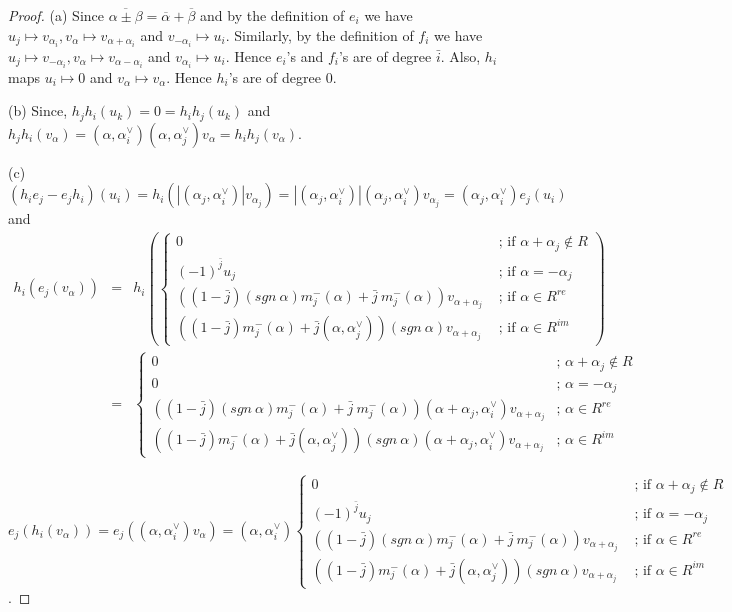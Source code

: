 \documentclass[11pt]{amsart}
\theoremstyle{plain}
\theoremstyle{definition}
\numberwithin{equation}{section}
\newcommand{\al}{\alpha}
\begin{document}
	\begin{proof} (a) Since $\overline{\alpha\pm\beta}=\overline\alpha+\overline\beta$ and by the definition of $e_i$ we have $u_j\mapsto v_{\alpha_i}, v_{\alpha}\mapsto v_{\alpha+\alpha_i}$ and $v_{-\alpha_i}\mapsto u_i$. Similarly, by the definition of $f_i$ we have $u_j\mapsto v_{-\alpha_i}, v_{\alpha}\mapsto v_{\alpha-\alpha_i}$ and $v_{\alpha_i}\mapsto u_i$. Hence $e_i$'s and $f_i$'s are of degree $\bar i$. Also, $h_i$ maps $u_i\mapsto 0$ and $v_{\alpha}\mapsto v_{\alpha}$. Hence $h_i$'s are of degree 0.
		
		\noindent
		(b) Since, $h_j h_i(u_k)=0=h_i h_j(u_k)$ and $h_j h_i(v_{\alpha})=(\alpha,\alpha_i^{\vee})(\alpha,\alpha_j^{\vee})v_{\alpha}=h_i h_j(v_{\alpha})$.
		
		\noindent
		(c) $(h_i e_j-e_j h_i)(u_i)=h_i(|(\alpha_j,\alpha_i^{\vee})|v_{\alpha_j})=|(\alpha_j,\alpha_i^{\vee})|(\alpha_j,\alpha_i^{\vee})v_{\alpha_j}=(\alpha_j,\alpha_i^{\vee})e_j(u_i)$ and 
		\begin{eqnarray*}
			h_i(e_j(v_{\alpha}))&=&h_i\left(\begin{cases}
				0&\text{ ; if }\alpha+\alpha_j\notin R\\(-1)^{\bar{j}}u_j&\text{ ; if }\alpha=-\alpha_j\\
				((1-\bar{j})(sgn~\al)m_j^-(\alpha)+\bar{j}~m_j^-(\alpha))v_{\alpha+\alpha_j}&\text{ ; if }\alpha\in R^{re}\\((1-\bar{j})m_j^-(\al)+\bar{j}(\alpha,\alpha_j^{\vee}))(sgn~\al)v_{\alpha+\alpha_j}&\text{ ; if }\alpha\in R^{im}
			\end{cases}\right)\\
			&=&\begin{cases}
				0&\text{; }\alpha+\alpha_j\notin R\\0&\text{; }\alpha=-\alpha_j\\
				((1-\bar{j})(sgn~\al)m_j^-(\alpha)+\bar{j}~m_j^-(\alpha))(\alpha+\alpha_j,\alpha_i^{\vee}) v_{\alpha+\alpha_j}&\text{; }\alpha\in R^{re}\\((1-\bar{j})m_j^-(\al)+\bar{j}(\alpha,\alpha_j^{\vee}))(sgn~\al)(\alpha+\alpha_j,\alpha_i^{\vee})v_{\alpha+\alpha_j}&\text{; }\alpha\in R^{im}
			\end{cases}	
		\end{eqnarray*}
		
		
		\noindent	
		$e_j(h_i(v_{\alpha}))=e_j((\alpha,\alpha_i^{\vee}) v_{\alpha})=
		(\alpha,\alpha_i^{\vee})\begin{cases}
			0&\text{ ; if }\alpha+\alpha_j\notin R\\(-1)^{\bar{j}}u_j&\text{ ; if }\alpha=-\alpha_j\\
			((1-\bar{j})(sgn~\al)m_j^-(\alpha)+\bar{j}~m_j^-(\alpha))v_{\alpha+\alpha_j}&\text{ ; if }\alpha\in R^{re}\\((1-\bar{j})m_j^-(\al)+\bar{j}(\alpha,\alpha_j^{\vee}))(sgn~\al)v_{\alpha+\alpha_j}&\text{ ; if }\alpha\in R^{im}
		\end{cases}$.
		

\end{proof}
\end{document}
